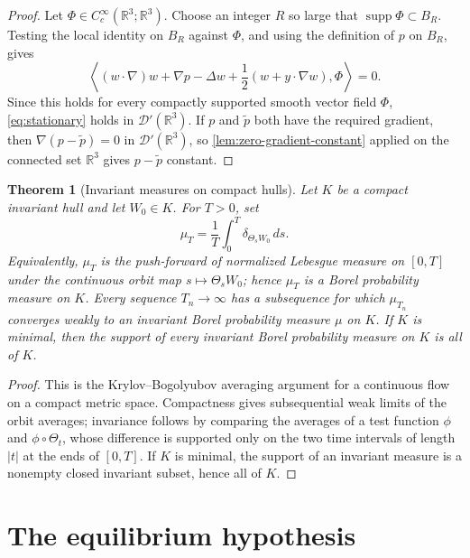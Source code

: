 \documentclass[11pt]{amsart}
\theoremstyle{plain}
\newtheorem{theorem}{Theorem}[section]
\theoremstyle{definition}
\theoremstyle{remark}
\numberwithin{equation}{section}
\begin{document}
\begin{proof}
Let \(\Phi\in C_c^\infty(\mathbb R^3;\mathbb R^3)\).  Choose an integer \(R\)
so large that \(\operatorname{supp}\Phi\subset B_R\).  Testing the local
identity on \(B_R\) against \(\Phi\), and using the definition of \(p\) on
\(B_R\), gives
\[
   \left\langle
      (w\cdot\nabla)w+\nabla p
      -\Delta w+\frac12(w+y\cdot\nabla w),
      \Phi
   \right\rangle=0 .
\]
Since this holds for every compactly supported smooth vector field \(\Phi\),
\eqref{eq:stationary} holds in \(\mathcal D'(\mathbb R^3)\).  If \(p\) and
\(\tilde p\) both have the required gradient, then
\(\nabla(p-\tilde p)=0\) in \(\mathcal D'(\mathbb R^3)\), so
\cref{lem:zero-gradient-constant} applied on the connected set
\(\mathbb R^3\) gives
\(p-\tilde p\) constant.
\end{proof}

\begin{theorem}[Invariant measures on compact hulls]\label{thm:invariant-measures}
Let \(K\) be a compact invariant hull and let \(W_0\in K\).  For \(T>0\), set
\[
   \mu_T=\frac1T\int_0^T\delta_{\Theta_sW_0}\,ds .
\]
Equivalently, \(\mu_T\) is the push-forward of normalized Lebesgue measure on
\([0,T]\) under the continuous orbit map \(s\mapsto\Theta_sW_0\); hence
\(\mu_T\) is a Borel probability measure on \(K\).
Every sequence \(T_n\to\infty\) has a subsequence for which \(\mu_{T_n}\)
converges weakly to an invariant Borel probability measure \(\mu\) on \(K\).
If \(K\) is minimal, then the support of every invariant Borel probability
measure on \(K\) is all of \(K\).
\end{theorem}

\begin{proof}
This is the Krylov--Bogolyubov averaging argument for a continuous flow on a
compact metric space.  Compactness gives subsequential weak limits of the orbit
averages; invariance follows by comparing the averages of a test function
\(\phi\) and \(\phi\circ\Theta_t\), whose difference is supported only on the
two time intervals of length \(|t|\) at the ends of \([0,T]\).  If \(K\) is
minimal, the support of an invariant measure is a nonempty closed invariant
subset, hence all of \(K\).
\end{proof}

\section{The equilibrium hypothesis}
\end{document}
